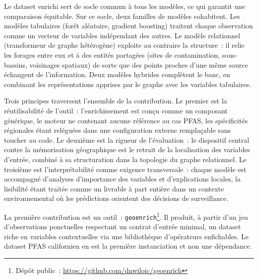 \label{sec:contrib-enrichissement-prediction}
Le dataset enrichi sert de socle commun \`a tous les mod\`eles, ce qui garantit une comparaison \'equitable. Sur ce socle, deux familles de mod\`eles cohabitent. Les mod\`eles tabulaires (for\^et al\'eatoire, gradient boosting) traitent chaque observation comme un vecteur de variables ind\'ependant des autres. Le mod\`ele relationnel (transformeur de graphe h\'et\'erog\`ene) exploite au contraire la structure~: il relie les forages entre eux et \`a des entit\'es partag\'ees (sites de contamination, sous-bassins, voisinages spatiaux) de sorte que des points proches d'une m\^eme source \'echangent de l'information.
Deux mod\`eles hybrides compl\`etent le banc, en combinant les repr\'esentations apprises par le graphe avec les variables tabulaires.

\label{sec:contrib-principes}

Trois principes traversent l'ensemble de la contribution. Le premier est la r\'eutilisabilit\'e de l'outil~: l'enrichissement est con\c{c}u comme un composant g\'en\'erique, le moteur ne contenant aucune r\'ef\'erence au cas PFAS, les sp\'ecificit\'es r\'egionales \'etant rel\'egu\'ees dans une configuration externe rempla\c{c}able sans toucher au code. Le deuxi\`eme est la rigueur de l'\'evaluation~: le dispositif central contre la m\'emorisation g\'eographique est le retrait de la localisation des variables d'entr\'ee, combin\'e \`a sa structuration dans la topologie du graphe relationnel. Le troisi\`eme est l'interpr\'etabilit\'e comme exigence transversale~: chaque mod\`ele est accompagn\'e d'analyses d'importance des variables et d'explications locales, la lisibilit\'e \'etant trait\'ee comme un livrable \`a part enti\`ere dans un contexte environnemental o\`u les pr\'edictions orientent des d\'ecisions de surveillance.


\label{sec:geoenrich}

La premi\`ere contribution est un outil~: \texttt{geoenrich}\footnote{D\'ep\^ot public~: \url{https://github.com/dnwiloic/geoenrich}}. Il produit, \`a partir d'un jeu d'observations ponctuelles respectant un contrat d'entr\'ee minimal, un dataset riche en variables contextuelles via une biblioth\`eque d'op\'erateurs enfichables. Le dataset PFAS californien en est la premi\`ere instanciation et non une d\'ependance.

